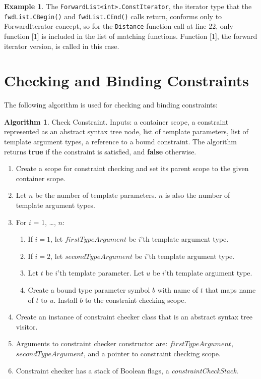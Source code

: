 \documentclass[a4paper,oneside,11pt]{book}
\theoremstyle{definition}
\newtheorem{exmp}{Example}[section]
\newtheorem{algo}{Algorithm}[section]
\begin{document}
\begin{exmp}
The \verb|ForwardList<int>.ConstIterator|, the iterator type that the \verb|fwdList.CBegin()| and \verb|fwdList.CEnd()| calls return, conforms only to ForwardIterator concept,
so for the \verb|Distance| function call at line 22, only function [1] is included in the list of matching functions.
Function [1], the forward iterator version, is called in this case.
\end{exmp}

\clearpage
\section{Checking and Binding Constraints}

The following algorithm is used for checking and binding constraints:

\begin{algo} Check Constraint. Inputs: a container scope, a constraint represented as an abstract syntax tree node,
list of template parameters, list of template argument types, a reference to a bound constraint.
The algorithm returns \textbf{true} if the constraint is satisfied, and \textbf{false} otherwise.
\begin{enumerate}
\item
Create a scope for constraint checking and set its parent scope to the given container scope.
\item
Let $n$ be the number of template parameters. $n$ is also the number of template argument types.
\item
For $i$ = 1, \ldots, $n$:
\begin{enumerate}
\item
If $i = 1$, let $firstTypeArgument$ be $i$'th template argument type.
\item
If $i = 2$, let $secondTypeArgument$ be $i$'th template argument type.
\item
Let $t$ be $i$'th template parameter. Let $u$ be $i$'th template argument type.
\item
Create a bound type parameter symbol $b$ with name of $t$ that maps name of $t$ to $u$. Install $b$ to the constraint checking scope.
\end{enumerate}
\item
Create an instance of constraint checker class that is an abstract syntax tree visitor.
\item
Arguments to constraint checker constructor are: $firstTypeArgument$, $secondTypeArgument$, and a pointer to constraint checking scope.
\item
Constraint checker has a stack of Boolean flags, a \emph{constraintCheckStack}.

\end{enumerate}
\end{algo}
\end{document}

